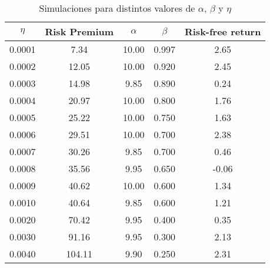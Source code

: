 \documentclass[12pt]{article}
\begin{document}
\begin{table}[!htb]                                                        
\centering                                                           
\begin{tabular}{|c|c|c|c|c|}                                         
\hline                                                               
$\eta$ & Risk Premium & $\alpha$ & $\beta$ & Risk-free return \\           
\hline                                                               
0.0001 & 7.34 & 10.00 & 0.997 & 2.65 \\                              
\hline                                                               
0.0002 & 12.05 & 10.00 & 0.920 & 2.45 \\                             
\hline                                                               
0.0003 & 14.98 & 9.85 & 0.890 & 0.24 \\                              
\hline                                                               
0.0004 & 20.97 & 10.00 & 0.800 & 1.76 \\                             
\hline                                                               
0.0005 & 25.22 & 10.00 & 0.750 & 1.63 \\                             
\hline                                                               
0.0006 & 29.51 & 10.00 & 0.700 & 2.38 \\                             
\hline                                                               
0.0007 & 30.26 & 9.85 & 0.700 & 0.46 \\                              
\hline                                                               
0.0008 & 35.56 & 9.95 & 0.650 & -0.06 \\                             
\hline                                                               
0.0009 & 40.62 & 10.00 & 0.600 & 1.34 \\                             
\hline                                                               
0.0010 & 40.64 & 9.85 & 0.600 & 1.21 \\                              
\hline                                                               
0.0020 & 70.42 & 9.95 & 0.400 & 0.35 \\                              
\hline                                                               
0.0030 & 91.16 & 9.95 & 0.300 & 2.13 \\                              
\hline                                                               
0.0040 & 104.11 & 9.90 & 0.250 & 2.31 \\                             
\hline                                                               
\end{tabular}                                                        
\caption{Simulaciones para distintos valores de $\alpha$, $\beta$ y $\eta$}
\label{table:table_replication}                                      
\end{table}                             
\end{document}

